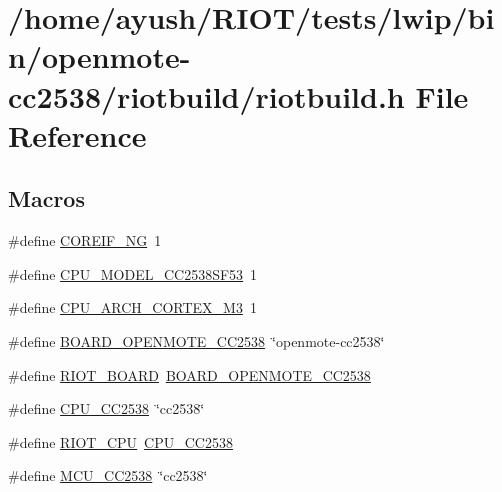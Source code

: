\hypertarget{openmote-cc2538_2riotbuild_2riotbuild_8h}{}\section{/home/ayush/\+R\+I\+O\+T/tests/lwip/bin/openmote-\/cc2538/riotbuild/riotbuild.h File Reference}
\label{openmote-cc2538_2riotbuild_2riotbuild_8h}
\subsection*{Macros}
\begin{DoxyCompactItemize}
\item 
\#define \hyperlink{openmote-cc2538_2riotbuild_2riotbuild_8h_a79e9c4c1e7be5dd3304aa20419746c5c}{C\+O\+R\+E\+I\+F\+\_\+\+NG}~1
\item 
\#define \hyperlink{openmote-cc2538_2riotbuild_2riotbuild_8h_a29a404cda35cf2a13d1ab54ec3cd6d01}{C\+P\+U\+\_\+\+M\+O\+D\+E\+L\+\_\+\+C\+C2538\+S\+F53}~1
\item 
\#define \hyperlink{openmote-cc2538_2riotbuild_2riotbuild_8h_a12afc0008e3065dda693a071716936b3}{C\+P\+U\+\_\+\+A\+R\+C\+H\+\_\+\+C\+O\+R\+T\+E\+X\+\_\+\+M3}~1
\item 
\#define \hyperlink{openmote-cc2538_2riotbuild_2riotbuild_8h_a130c07be864b409634e44cd734273a7a}{B\+O\+A\+R\+D\+\_\+\+O\+P\+E\+N\+M\+O\+T\+E\+\_\+\+C\+C2538}~\char`\"{}openmote-\/cc2538\char`\"{}
\item 
\#define \hyperlink{openmote-cc2538_2riotbuild_2riotbuild_8h_a8fc9a8d57dbc30d25ba92e07f931ed25}{R\+I\+O\+T\+\_\+\+B\+O\+A\+RD}~\hyperlink{openmote-cc2538_2riotbuild_2riotbuild_8h_a130c07be864b409634e44cd734273a7a}{B\+O\+A\+R\+D\+\_\+\+O\+P\+E\+N\+M\+O\+T\+E\+\_\+\+C\+C2538}
\item 
\#define \hyperlink{openmote-cc2538_2riotbuild_2riotbuild_8h_a322810aa4e73cca99416e2a09a111d65}{C\+P\+U\+\_\+\+C\+C2538}~\char`\"{}cc2538\char`\"{}
\item 
\#define \hyperlink{openmote-cc2538_2riotbuild_2riotbuild_8h_add6ad5e916f98426d3e10ced48f0caaf}{R\+I\+O\+T\+\_\+\+C\+PU}~\hyperlink{openmote-cc2538_2riotbuild_2riotbuild_8h_a322810aa4e73cca99416e2a09a111d65}{C\+P\+U\+\_\+\+C\+C2538}
\item 
\#define \hyperlink{openmote-cc2538_2riotbuild_2riotbuild_8h_ac81d7d4ef604e0f03ff7a9769d1fcd64}{M\+C\+U\+\_\+\+C\+C2538}~\char`\"{}cc2538\char`\"{}

\end{DoxyCompactItemize}
